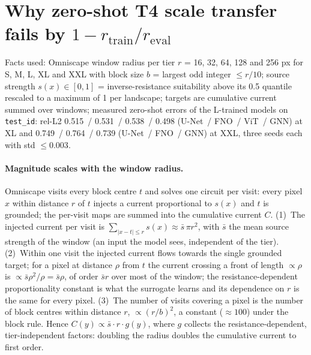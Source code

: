 \documentclass{article}
\newcommand{\relltwo}{rel-L2}
\newcommand{\code}[1]{\texttt{#1}}
\begin{document}

{\small}

\newpage
\appendix
\makeatletter\setlength{\@fptop}{0pt}\makeatother  %

\FloatBarrier
\section{Why zero-shot T4 scale transfer fails by $1-r_{\mathrm{train}}/r_{\mathrm{eval}}$}
\label{app:derivation}

Facts used: Omniscape window radius per tier $r$ = 16, 32, 64, 128 and 256 px for S, M, L, XL and XXL with block size $b$ = largest odd integer $\le r/10$; source strength $s(x)\in[0,1]$ = inverse-resistance suitability above its 0.5 quantile rescaled to a maximum of 1 per landscape; targets are cumulative current summed over windows; measured zero-shot errors of the L-trained models on \code{test\_id}: \relltwo{} 0.515~/ 0.531~/ 0.538~/ 0.498 (U-Net~/ FNO~/ ViT~/ GNN) at XL and 0.749~/ 0.764~/ 0.739 (U-Net~/ FNO~/ GNN) at XXL, three seeds each with std $\le 0.003$.

\paragraph{Magnitude scales with the window radius.} Omniscape visits every block centre $t$ and solves one circuit per visit: every pixel $x$ within distance $r$ of $t$ injects a current proportional to $s(x)$ and $t$ is grounded; the per-visit maps are summed into the cumulative current $C$. (1)~The injected current per visit is $\sum_{|x-t|\le r}s(x)\approx \bar s\,\pi r^2$, with $\bar s$ the mean source strength of the window (an input the model sees, independent of the tier). (2)~Within one visit the injected current flows towards the single grounded target; for a pixel at distance $\rho$ from $t$ the current crossing a front of length $\propto\rho$ is $\propto \bar s\rho^2/\rho=\bar s\rho$, of order $\bar s r$ over most of the window; the resistance-dependent proportionality constant is what the surrogate learns and its dependence on $r$ is the same for every pixel. (3)~The number of visits covering a pixel is the number of block centres within distance $r$, $\propto (r/b)^2$, a constant ($\approx 100$) under the block rule. Hence $C(y)\propto \bar s\cdot r\cdot g(y)$, where $g$ collects the resistance-dependent, tier-independent factors: doubling the radius doubles the cumulative current to first order.
\end{document}
